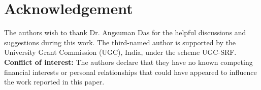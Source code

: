 \documentclass[11pt,twoside]{amsart}
\begin{document}
   \section{Acknowledgement}
    The authors wish to thank Dr. Angsuman Das for the helpful discussions and suggestions during this work. The third-named author is supported by the University Grant Commission (UGC), India, under the scheme UGC-SRF.\\



\noindent \textbf{Conflict of interest:} The authors declare that they have no known competing financial interests or personal
relationships that could have appeared to influence the work reported in this paper.\\



  
    
\end{document}
